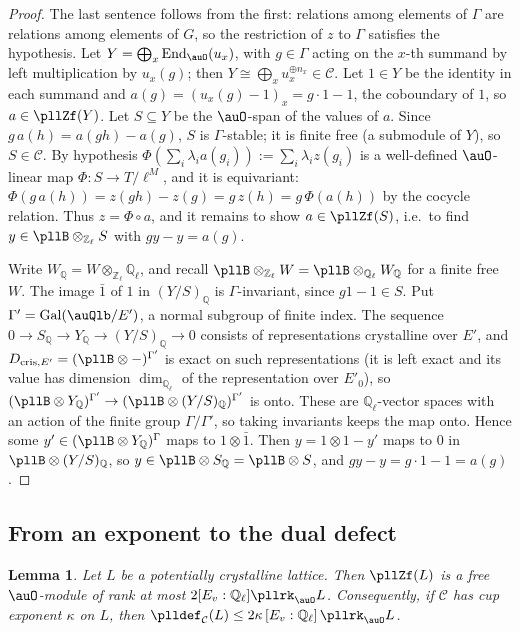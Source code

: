 \documentclass[10pt]{amsart}
\newtheorem{lemma}[theorem]{Lemma}
\theoremstyle{definition}
\theoremstyle{remark}
\newcommand{\Z}{\mathbb Z}
\newcommand{\Q}{\mathbb Q}
\begin{document}
\begin{proof}
The last sentence follows from the first: relations among elements of $\Gamma$ are relations among
elements of $G$, so the restriction of $z$ to $\Gamma$ satisfies the hypothesis.
Let $Y=\bigoplus_x\operatorname{End}_\auO(u_x)$, with $g\in\Gamma$ acting on the $x$-th summand
by left multiplication by $u_x(g)$; then $Y\cong\bigoplus_xu_x^{\oplus n_x}\in\mathcal C$. Let
$1\in Y$ be the identity in each summand and $a(g)=(u_x(g)-1)_x=g\cdot1-1$, the coboundary of $1$,
so $a\in\pllZf(Y)$. Let $S\subseteq Y$ be the $\auO$-span of the values of $a$. Since
$g\,a(h)=a(gh)-a(g)$, $S$ is $\Gamma$-stable; it is finite free (a submodule of $Y$), so
$S\in\mathcal C$. By hypothesis $\Phi(\sum_i\lambda_ia(g_i)):=\sum_i\lambda_iz(g_i)$ is a
well-defined $\auO$-linear map $\Phi\colon S\to T/\ell^M$, and it is equivariant:
$\Phi(g\,a(h))=z(gh)-z(g)=g\,z(h)=g\,\Phi(a(h))$ by the cocycle relation. Thus $z=\Phi\circ a$,
and it remains to show $a\in\pllZf(S)$, i.e.\ to find $y\in\pllB\otimes_{\Z_\ell}S$ with
$gy-y=a(g)$.

Write $W_\Q=W\otimes_{\Z_\ell}\Q_\ell$, and recall $\pllB\otimes_{\Z_\ell}W=\pllB\otimes_{\Q_\ell}
W_\Q$ for a finite free $W$. The image $\bar1$ of $1$ in $(Y/S)_\Q$ is $\Gamma$-invariant, since
$g1-1\in S$. Put $\Gamma'=\operatorname{Gal}(\auQlb/E')$, a normal subgroup of finite index. The
sequence $0\to S_\Q\to Y_\Q\to(Y/S)_\Q\to0$ consists of representations crystalline over $E'$, and
$D_{\mathrm{cris},E'}=(\pllB\otimes-)^{\Gamma'}$ is exact on such representations (it is left exact
and its value has dimension $\dim_{\Q_\ell}$ of the representation over
$E'_0$), so $(\pllB\otimes Y_\Q)^{\Gamma'}\to(\pllB\otimes(Y/S)_\Q)^{\Gamma'}$ is onto. These are
$\Q_\ell$-vector spaces with an action of the finite group $\Gamma/\Gamma'$, so taking invariants
keeps the map onto. Hence some $y'\in(\pllB\otimes Y_\Q)^\Gamma$ maps to $1\otimes\bar1$. Then
$y=1\otimes1-y'$ maps to $0$ in $\pllB\otimes(Y/S)_\Q$, so $y\in\pllB\otimes S_\Q=\pllB\otimes S$,
and $gy-y=g\cdot1-1=a(g)$.
\end{proof}

\subsection{From an exponent to the dual defect}\label{pll:ss-exponent}

\begin{lemma}\label{pll:exp}
Let $L$ be a potentially crystalline lattice. Then $\pllZf(L)$ is a free $\auO$-module of rank at
most $2[E_v:\Q_\ell]\pllrk_\auO L$. Consequently, if $\mathcal C$ has cup exponent $\kappa$ on $L$, then
$\plldef_{\mathcal C}(L)\le2\kappa\,[E_v:\Q_\ell]\,\pllrk_\auO L$.
\end{lemma}
\end{document}
